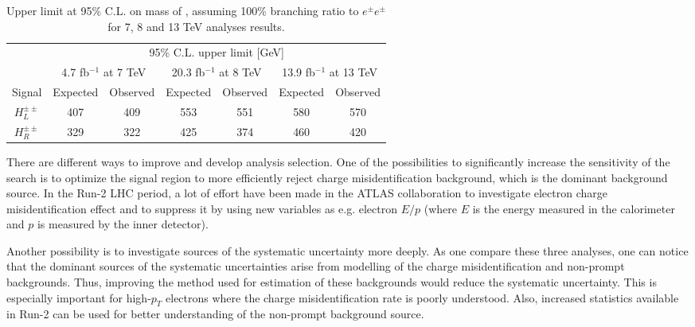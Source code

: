 \begin{table*}[]
\begin{center}
\begin{tabular}{c||c|c||c|c||c|c}

 & \multicolumn{6}{c}{95\%  C.L. upper limit [GeV]} \\
 & \multicolumn{2}{c||}{4.7 fb$^{-1}$ at 7 TeV} & \multicolumn{2}{c||}{20.3 fb$^{-1}$ at 8 TeV} & \multicolumn{2}{c}{13.9 fb$^{-1}$ at 13 TeV} \\
 \hline
Signal & Expected & Observed & Expected & Observed & Expected & Observed \\
\hline
\rule{0pt}{3ex}

$H^{\pm\pm}_L$ & 407 & 409 & 553 & 551 & 580 & 570 \\
\hline
$H^{\pm\pm}_R$ & 329 & 322 & 425 & 374 & 460 & 420 \\
\end{tabular}
\end{center}
 \caption{Upper limit at 95\% C.L. on mass of \dch, assuming 100\% branching ratio to $e^{\pm}e^{\pm}$ for 7, 8 and 13 TeV analyses results.}
\label{tab:DCH_limit_vs_years}
\end{table*}

There are different ways to improve and develop analysis selection.
One of the possibilities to significantly increase the sensitivity of the search is to optimize the signal region to more efficiently reject charge misidentification background, which is the dominant background source. In the Run-2 LHC period, a lot of effort have been made in the ATLAS collaboration to investigate electron charge misidentification effect and to suppress it by using new variables as e.g. electron $E/p$ (where $E$ is the energy measured in the calorimeter and $p$ is measured by the inner detector).

Another possibility is to investigate sources of the systematic uncertainty more deeply.
As one compare these three analyses, one can notice that the dominant sources of the systematic uncertainties arise from modelling of the charge misidentification and non-prompt backgrounds. Thus, improving the method used for estimation of these backgrounds would reduce the systematic uncertainty. This is especially important for high-$p_T$ electrons where the charge misidentification rate is poorly understood.
Also, increased statistics available in Run-2 can be used for better understanding of the non-prompt background source.

